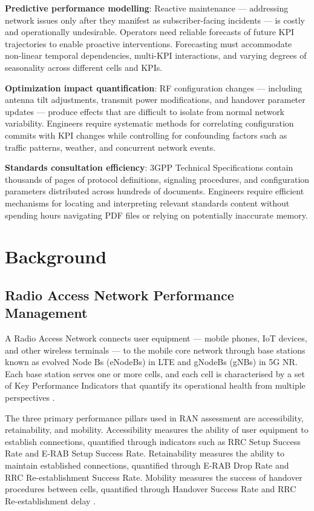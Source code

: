 \textbf{Predictive performance modelling}: Reactive maintenance — addressing network issues only after they manifest as subscriber-facing incidents — is costly and operationally undesirable. Operators need reliable forecasts of future KPI trajectories to enable proactive interventions. Forecasting must accommodate non-linear temporal dependencies, multi-KPI interactions, and varying degrees of seasonality across different cells and KPIs.

\textbf{Optimization impact quantification}: RF configuration changes — including antenna tilt adjustments, transmit power modifications, and handover parameter updates — produce effects that are difficult to isolate from normal network variability. Engineers require systematic methods for correlating configuration commits with KPI changes while controlling for confounding factors such as traffic patterns, weather, and concurrent network events.

\textbf{Standards consultation efficiency}: 3GPP Technical Specifications contain thousands of pages of protocol definitions, signaling procedures, and configuration parameters distributed across hundreds of documents. Engineers require efficient mechanisms for locating and interpreting relevant standards content without spending hours navigating PDF files or relying on potentially inaccurate memory.

\section{Background}

\subsection{Radio Access Network Performance Management}

A Radio Access Network connects user equipment — mobile phones, IoT devices, and other wireless terminals — to the mobile core network through base stations known as evolved Node Bs (eNodeBs) in LTE and gNodeBs (gNBs) in 5G NR. Each base station serves one or more cells, and each cell is characterised by a set of Key Performance Indicators that quantify its operational health from multiple perspectives \cite{dahlman2020}.

The three primary performance pillars used in RAN assessment are accessibility, retainability, and mobility. Accessibility measures the ability of user equipment to establish connections, quantified through indicators such as RRC Setup Success Rate and E-RAB Setup Success Rate. Retainability measures the ability to maintain established connections, quantified through E-RAB Drop Rate and RRC Re-establishment Success Rate. Mobility measures the success of handover procedures between cells, quantified through Handover Success Rate and RRC Re-establishment delay \cite{sesia2011}.

